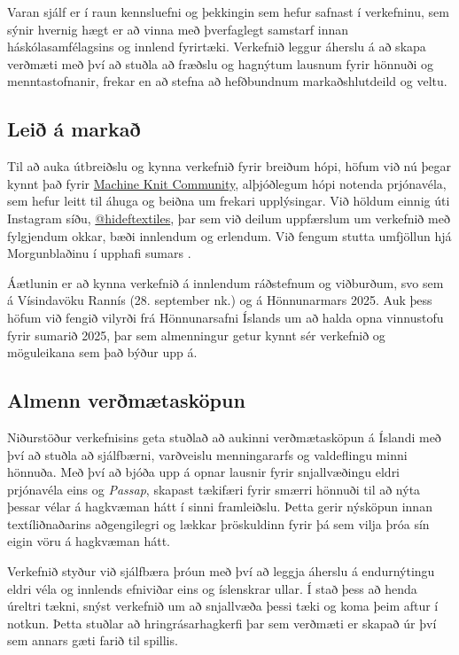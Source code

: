 \documentclass[a4paper,12pt,twoside]{article}
\begin{document}
Varan sjálf er í raun kennsluefni og þekkingin sem hefur safnast í verkefninu, sem sýnir hvernig hægt er að vinna með þverfaglegt samstarf innan háskólasamfélagsins og innlend fyrirtæki. Verkefnið leggur áherslu á að skapa verðmæti með því að stuðla að fræðslu og hagnýtum lausnum fyrir hönnuði og menntastofnanir, frekar en að stefna að hefðbundnum markaðshlutdeild og veltu.

\subsection{Leið á markað}
Til að auka útbreiðslu og kynna verkefnið fyrir breiðum hópi, höfum við nú þegar kynnt það fyrir \href{https://www.mkc.community/about-us}{Machine Knit Community}, alþjóðlegum hópi notenda prjónavéla, sem hefur leitt til áhuga og beiðna um frekari upplýsingar. Við höldum einnig úti Instagram síðu, \href{https://www.instagram.com/hideftextiles/}{@hideftextiles}, þar sem við deilum uppfærslum um verkefnið með fylgjendum okkar, bæði innlendum og erlendum. Við fengum stutta umfjöllun hjá Morgunblaðinu í upphafi sumars \cite{mbl2024}.

Áætlunin er að kynna verkefnið á innlendum ráðstefnum og viðburðum, svo sem á Vísindavöku Rannís (28. september nk.) og á Hönnunarmars 2025. Auk þess höfum við fengið vilyrði frá Hönnunarsafni Íslands um að halda opna vinnustofu fyrir sumarið 2025, þar sem almenningur getur kynnt sér verkefnið og möguleikana sem það býður upp á.

\subsection{Almenn verðmætasköpun}
Niðurstöður verkefnisins geta stuðlað að aukinni verðmætasköpun á Íslandi með því að stuðla að sjálfbærni, varðveislu menningararfs og valdeflingu minni hönnuða. Með því að bjóða upp á opnar lausnir fyrir snjallvæðingu eldri prjónavéla eins og \textit{Passap}, skapast tækifæri fyrir smærri hönnuði til að nýta þessar vélar á hagkvæman hátt í sinni framleiðslu. Þetta gerir nýsköpun innan textíliðnaðarins aðgengilegri og lækkar þröskuldinn fyrir þá sem vilja þróa sín eigin vöru á hagkvæman hátt.

Verkefnið styður við sjálfbæra þróun með því að leggja áherslu á endurnýtingu eldri véla og innlends efniviðar eins og íslenskrar ullar. Í stað þess að henda úreltri tækni, snýst verkefnið um að snjallvæða þessi tæki og koma þeim aftur í notkun. Þetta stuðlar að hringrásarhagkerfi þar sem verðmæti er skapað úr því sem annars gæti farið til spillis.
\end{document}

